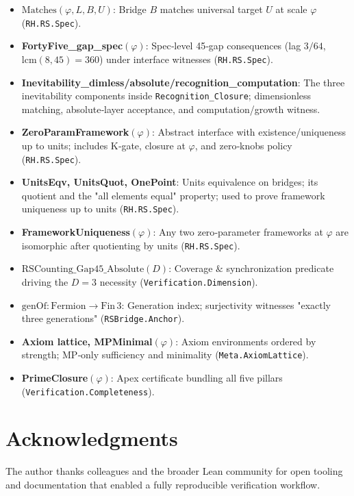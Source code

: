 \documentclass{article}
\begin{document}
\begin{itemize}[leftmargin=*]
  \item \textbf{$\mathrm{Matches}(\varphi,L,B,U)$}: Bridge \(B\) matches universal target \(U\) at scale \(\varphi\) (\texttt{RH.RS.Spec}).
  \item \textbf{FortyFive\_gap\_spec$(\varphi)$}: Spec‑level 45‑gap consequences (lag \(3/64\), \(\mathrm{lcm}(8,45)=360\)) under interface witnesses (\texttt{RH.RS.Spec}).
  \item \textbf{Inevitability\_dimless/absolute/recognition\_computation}: The three inevitability components inside \texttt{Recognition\_Closure}; dimensionless matching, absolute‑layer acceptance, and computation/growth witness.
  \item \textbf{ZeroParamFramework$(\varphi)$}: Abstract interface with existence/uniqueness up to units; includes K‑gate, closure at \(\varphi\), and zero‑knobs policy (\texttt{RH.RS.Spec}).
  \item \textbf{UnitsEqv, UnitsQuot, OnePoint}: Units equivalence on bridges; its quotient and the "all elements equal" property; used to prove framework uniqueness up to units (\texttt{RH.RS.Spec}).
  \item \textbf{FrameworkUniqueness$(\varphi)$}: Any two zero‑parameter frameworks at \(\varphi\) are isomorphic after quotienting by units (\texttt{RH.RS.Spec}).
  \item \textbf{$\mathrm{RSCounting\_Gap45\_Absolute}(D)$}: Coverage \(\&\) synchronization predicate driving the \(D=3\) necessity (\texttt{Verification.Dimension}).
  \item \textbf{$\mathrm{genOf}: \mathrm{Fermion}\to \mathrm{Fin}\,3$}: Generation index; surjectivity witnesses "exactly three generations" (\texttt{RSBridge.Anchor}).
  \item \textbf{Axiom lattice, MPMinimal$(\varphi)$}: Axiom environments ordered by strength; MP‑only sufficiency and minimality (\texttt{Meta.AxiomLattice}).
  \item \textbf{PrimeClosure$(\varphi)$}: Apex certificate bundling all five pillars (\texttt{Verification.Completeness}).
\end{itemize}

\section{Acknowledgments}
The author thanks colleagues and the broader Lean community for open tooling and documentation that enabled a fully reproducible verification workflow.
\end{document}
